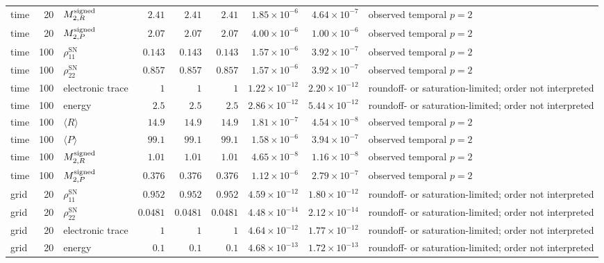 \begin{landscape}
\begin{longtable}{l r l r r r r r L{0.18\textwidth}}
time & 20 & $M^{\rm signed}_{2,R}$ & $2.41$ & $2.41$ & $2.41$ & $1.85\times10^{-6}$ & $4.64\times10^{-7}$ & observed temporal $p=2$ \\
time & 20 & $M^{\rm signed}_{2,P}$ & $2.07$ & $2.07$ & $2.07$ & $4.00\times10^{-6}$ & $1.00\times10^{-6}$ & observed temporal $p=2$ \\
time & 100 & $\rho_{11}^{\mathrm{SN}}$ & $0.143$ & $0.143$ & $0.143$ & $1.57\times10^{-6}$ & $3.92\times10^{-7}$ & observed temporal $p=2$ \\
time & 100 & $\rho_{22}^{\mathrm{SN}}$ & $0.857$ & $0.857$ & $0.857$ & $1.57\times10^{-6}$ & $3.92\times10^{-7}$ & observed temporal $p=2$ \\
time & 100 & electronic trace & $1$ & $1$ & $1$ & $1.22\times10^{-12}$ & $2.20\times10^{-12}$ & roundoff- or saturation-limited; order not interpreted \\
time & 100 & energy & $2.5$ & $2.5$ & $2.5$ & $2.86\times10^{-12}$ & $5.44\times10^{-12}$ & roundoff- or saturation-limited; order not interpreted \\
time & 100 & $\langle R\rangle$ & $14.9$ & $14.9$ & $14.9$ & $1.81\times10^{-7}$ & $4.54\times10^{-8}$ & observed temporal $p=2$ \\
time & 100 & $\langle P\rangle$ & $99.1$ & $99.1$ & $99.1$ & $1.58\times10^{-6}$ & $3.94\times10^{-7}$ & observed temporal $p=2$ \\
time & 100 & $M^{\rm signed}_{2,R}$ & $1.01$ & $1.01$ & $1.01$ & $4.65\times10^{-8}$ & $1.16\times10^{-8}$ & observed temporal $p=2$ \\
time & 100 & $M^{\rm signed}_{2,P}$ & $0.376$ & $0.376$ & $0.376$ & $1.12\times10^{-6}$ & $2.79\times10^{-7}$ & observed temporal $p=2$ \\
grid & 20 & $\rho_{11}^{\mathrm{SN}}$ & $0.952$ & $0.952$ & $0.952$ & $4.59\times10^{-12}$ & $1.80\times10^{-12}$ & roundoff- or saturation-limited; order not interpreted \\
grid & 20 & $\rho_{22}^{\mathrm{SN}}$ & $0.0481$ & $0.0481$ & $0.0481$ & $4.48\times10^{-14}$ & $2.12\times10^{-14}$ & roundoff- or saturation-limited; order not interpreted \\
grid & 20 & electronic trace & $1$ & $1$ & $1$ & $4.64\times10^{-12}$ & $1.77\times10^{-12}$ & roundoff- or saturation-limited; order not interpreted \\
grid & 20 & energy & $0.1$ & $0.1$ & $0.1$ & $4.68\times10^{-13}$ & $1.72\times10^{-13}$ & roundoff- or saturation-limited; order not interpreted \\

\end{longtable}
\end{landscape}
